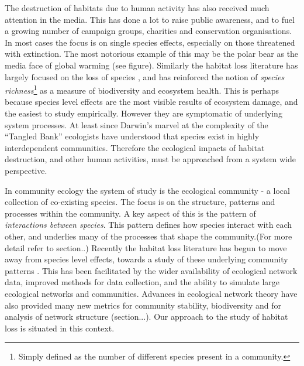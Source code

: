 \documentclass[12pt]{article}
\begin{document}
The destruction of habitats due to human activity has also received much attention in the media. This has done a lot to raise public awareness, and to fuel a growing number of campaign groups, charities and conservation organisations. In most cases the focus is on single species effects, especially on those threatened with extinction. The most notorious example of this may be the polar bear as the media face of global warming (see figure). Similarly the habitat loss literature has largely focused on the loss of species \cite{tilman1994habitat, foley2005global}, and has reinforced the notion of \emph{species richness}\footnote{Simply defined as the number of different species present in a community.} as a measure of biodiversity and ecosystem health. This is perhaps because species level effects are the most visible results of ecosystem damage, and the easiest to study empirically. However they are symptomatic of underlying system processes. At least since Darwin's marvel at the complexity of the ``Tangled Bank'' \cite{darwin2009origin} ecologists have understood that species exist in highly interdependent communities. Therefore the ecological impacts of habitat destruction, and other human activities, must be approached from a system wide perspective.


In community ecology the system of study is the ecological community - a local collection of co-existing species. The focus is on the structure, patterns and processes within the community. A key aspect of this is the pattern of \emph{interactions between species}. This pattern defines how species interact with each other, and underlies many of the processes that shape the community.(For more detail refer to section..) Recently the habitat loss literature has begun to move away from species level effects, towards a study of these underlying community patterns \cite{valiente2015beyond}. This has been facilitated by the wider availability of ecological network data, improved methods for data collection, and the ability to simulate large ecological networks and communities. Advances in ecological network theory have also provided many new metrics for community stability, biodiversity and for analysis of network structure (section...). Our approach to the study of habitat loss is situated in this context.
\end{document}
